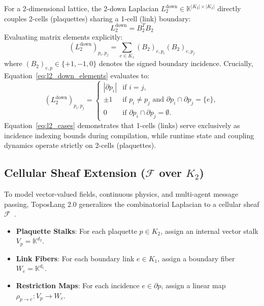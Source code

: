 \documentclass[conference]{IEEEtran}
\begin{document}
For a 2-dimensional lattice, the 2-down Laplacian $L_2^{\text{down}} \in \mathbb{K}^{|K_2| \times |K_2|}$ directly couples 2-cells (plaquettes) sharing a 1-cell (link) boundary:
\begin{equation}
L_2^{\text{down}} = B_2^T B_2
\label{eq:l2_down}
\end{equation}
Evaluating matrix elements explicitly:
\begin{equation}
(L_2^{\text{down}})_{p_i, p_j} = \sum_{e \in K_1} (B_2)_{e, p_i} (B_2)_{e, p_j}
\label{eq:l2_down_elements}
\end{equation}
where $(B_2)_{e, p} \in \{+1, -1, 0\}$ denotes the signed boundary incidence. Crucially, Equation~\eqref{eq:l2_down_elements} evaluates to:
\begin{equation}
(L_2^{\text{down}})_{p_i, p_j} = \begin{cases}
|\partial p_i| & \text{if } i = j, \\
\pm 1 & \text{if } p_i \neq p_j \text{ and } \partial p_i \cap \partial p_j = \{e\}, \\
0 & \text{if } \partial p_i \cap \partial p_j = \emptyset.
\end{cases}
\label{eq:l2_cases}
\end{equation}
Equation~\eqref{eq:l2_cases} demonstrates that 1-cells (links) serve exclusively as incidence indexing bounds during compilation, while runtime state and coupling dynamics operate strictly on 2-cells (plaquettes).

\subsection{Cellular Sheaf Extension ($\mathcal{F}$ over $K_2$)}
To model vector-valued fields, continuous physics, and multi-agent message passing, ToposLang 2.0 generalizes the combinatorial Laplacian to a cellular sheaf $\mathcal{F}$~\cite{curry2014sheaves,ghrist2014elementary}.
\begin{itemize}
    \item \textbf{Plaquette Stalks}: For each plaquette $p \in K_2$, assign an internal vector stalk $V_p = \mathbb{K}^{d_2}$.
    \item \textbf{Link Fibers}: For each boundary link $e \in K_1$, assign a boundary fiber $W_e = \mathbb{K}^{d_1}$.
    \item \textbf{Restriction Maps}: For each incidence $e \in \partial p$, assign a linear map $\rho_{p \to e} : V_p \to W_e$.
\end{itemize}
\end{document}
